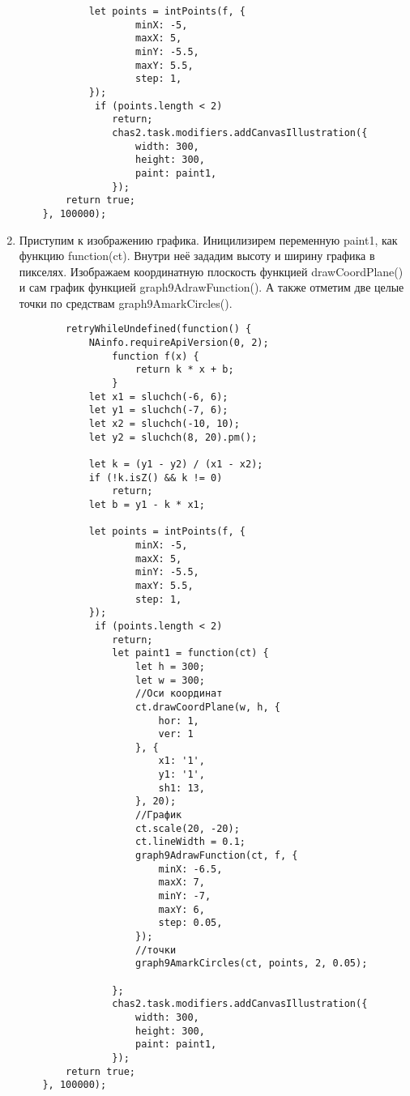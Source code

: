 \begin{enumerate}
\begin{verbatim}
            let points = intPoints(f, {
		            minX: -5,
		            maxX: 5,
		            minY: -5.5,
		            maxY: 5.5,
		            step: 1,
	        });
	         if (points.length < 2)
		        return;
                chas2.task.modifiers.addCanvasIllustration({
                    width: 300,
                    height: 300,
                    paint: paint1,
                });
        return true;
    }, 100000);
        \end{verbatim}
    \item Приступим к изображению графика. Иницилизирем переменную paint1, как функцию function(ct). Внутри неё зададим высоту и ширину графика в пикселях.
          Изображаем координатную плоскость функцией drawCoordPlane() и сам график функцией graph9AdrawFunction(). А также отметим две целые точки по средствам graph9AmarkCircles().
          \begin{verbatim}
        retryWhileUndefined(function() {
            NAinfo.requireApiVersion(0, 2);
                function f(x) {
                    return k * x + b;
                }
            let x1 = sluchch(-6, 6);
            let y1 = sluchch(-7, 6);
            let x2 = sluchch(-10, 10);
            let y2 = sluchch(8, 20).pm();
    
            let k = (y1 - y2) / (x1 - x2);
            if (!k.isZ() && k != 0)
                return;
            let b = y1 - k * x1;

            let points = intPoints(f, {
		            minX: -5,
		            maxX: 5,
		            minY: -5.5,
		            maxY: 5.5,
		            step: 1,
	        });
	         if (points.length < 2)
		        return;
                let paint1 = function(ct) {
                    let h = 300;
                    let w = 300;
                    //Оси координат
                    ct.drawCoordPlane(w, h, {
                        hor: 1,
                        ver: 1
                    }, {
                        x1: '1',
                        y1: '1',
                        sh1: 13,
                    }, 20);
                    //График
                    ct.scale(20, -20);
                    ct.lineWidth = 0.1;
                    graph9AdrawFunction(ct, f, {
                        minX: -6.5,
                        maxX: 7,
                        minY: -7,
                        maxY: 6,
                        step: 0.05,
                    });
                    //точки
                    graph9AmarkCircles(ct, points, 2, 0.05);

                };
                chas2.task.modifiers.addCanvasIllustration({
                    width: 300,
                    height: 300,
                    paint: paint1,
                });
        return true;
    }, 100000);
        \end{verbatim}
\end{enumerate}
